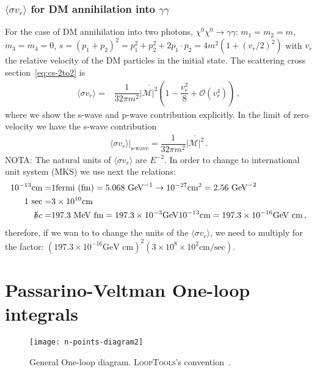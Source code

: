 \subsubsection{$\langle\sigma v_r\rangle$ for DM annihilation into $\gamma\gamma$}
For the case of DM annihilation into two photons, $\chi^0\chi^0\rightarrow\gamma\gamma$: $m_1=m_2=m$, $m_3=m_4=0$, $s=(p_1+p_2)^2=p_1^2+p_2^2+2p_1\cdot p_2=4m^2(1+(v_r/2)^2)$ with $v_r$ the relative velocity of the DM particles in the initial state.
The scattering cross section~\eqref{eq:cs-2to2} is
%
\begin{align}
\langle\sigma v_r\rangle=&\dfrac{1}{32\pi m^2}\overline{{|\mathcal{M}|^2}}\left(1-\dfrac{v_r^2}{8}+\mathcal{O}(v_r^4)\right)\,,
\end{align}
%
where we show the s-wave and p-wave contribution explicitly. In the limit of zero velocity we have the s-wave contribution
%
\begin{align}
\langle\sigma v_r\rangle|_{\text{s-wave}}=\dfrac{1}{32\pi m^2}\overline{{|\mathcal{M}|^2}}\,.
\end{align}
%
\noindent
{\color{red}NOTA}: The natural units of $\langle\sigma v_r\rangle$ are $E^{-2}$. In order to change to international unit system (MKS) we use next the relations:
\begin{align*}
10^{-13} \text{cm} = & 1 \text{fermi (fm)}=5.068\text{ GeV}^{-1} \to
10^{-27} \text{cm}^2 = 2.56 \text{ GeV}^{-2} \\
1 \text{ sec} =& 3\times10^{10} \text{cm} \\
\slashed{h}c =& 197.3 \text{ MeV }\text{fm}=197.3\times10^{-3} \text{GeV} 10^{-13} \text{cm}=197.3\times10^{-16} \text{GeV cm}\,,
\end{align*}
%
therefore, if we wan to to change the units of the $\langle\sigma v_r\rangle$, we need to multiply for the factor:
$(197.3\times 10^{-16} \text{GeV cm})^2 (3\times 10^8\times 10^2 \text{cm/sec})$.










\section{Passarino-Veltman One-loop integrals}
\label{sec:passarino-veltman}

\begin{figure}[h]
\centering
\texttt{[image: n-points-diagram2]}
\caption{General One-loop diagram. \textsc{LoopTools}'s convention~\cite{Hahn:1998yk}.}
\end{figure}

